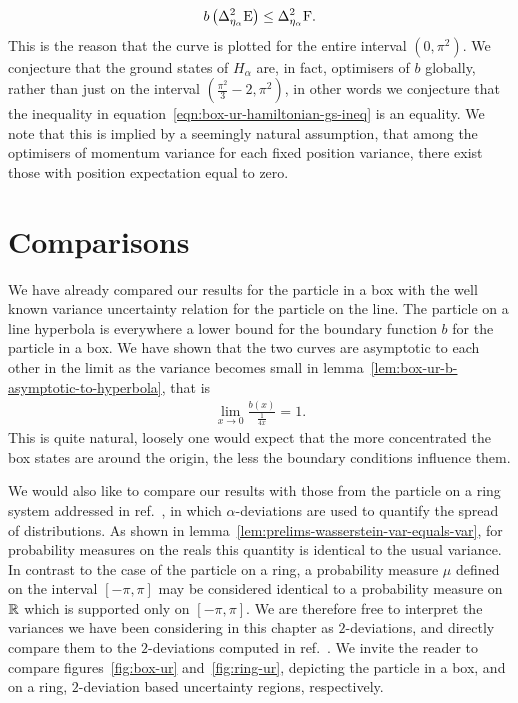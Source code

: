 \begin{align}\label{eqn:box-ur-hamiltonian-gs-ineq}
  b\left(\var[\eta_\alpha]{\ope}\right) \leq \var[\eta_\alpha]{\opf}.
\end{align}
This is the reason that the curve is plotted for the entire interval $(0, \pi^2)$. We conjecture that the ground states of $H_\alpha$ are, in fact, optimisers of $b$ globally, rather than just on the interval $\left(\frac{\pi^2}{3} -2, \pi^2\right)$, in other words we conjecture that the inequality in equation~\ref{eqn:box-ur-hamiltonian-gs-ineq} is an equality. We note that this is implied by a seemingly natural assumption, that among the optimisers of momentum variance for each fixed position variance, there exist those with position expectation equal to zero.

\section{Comparisons}\label{sec:box-ur-comparisons}

We have already compared our results for the particle in a box with the well known variance uncertainty relation for the particle on the line. The particle on a line hyperbola is everywhere a lower bound for the boundary function $b$ for the particle in a box. We have shown that the two curves are asymptotic to each other in the limit as the variance becomes small in lemma~\ref{lem:box-ur-b-asymptotic-to-hyperbola}, that is
\begin{align}
  \lim_{x\to 0} \frac{b(x)}{\frac{1}{4x}} = 1.
\end{align}
This is quite natural, loosely one would expect that the more concentrated the box states are around the origin, the less the boundary conditions influence them. 

We would also like to compare our results with those from the particle on a ring system addressed in ref.~\cite{sharp-ur-num-angle}, in which $\alpha$-deviations are used to quantify the spread of distributions. As shown in lemma~\ref{lem:prelims-wasserstein-var-equals-var}, for probability measures on the reals this quantity is identical to the usual variance. In contrast to the case of the particle on a ring, a probability measure $\mu$ defined on the interval $[-\pi,\pi]$ may be considered identical to a probability measure on $\mathbb{R}$ which is supported only on $[-\pi,\pi]$. 
We are therefore free to interpret the variances we have been considering in this chapter as $2$-deviations, and directly compare them to the $2$-deviations computed in ref.~\cite{sharp-ur-num-angle}. We invite the reader to compare figures~\ref{fig:box-ur} and~\ref{fig:ring-ur}, depicting the particle in a box, and on a ring, $2$-deviation based uncertainty regions, respectively.

